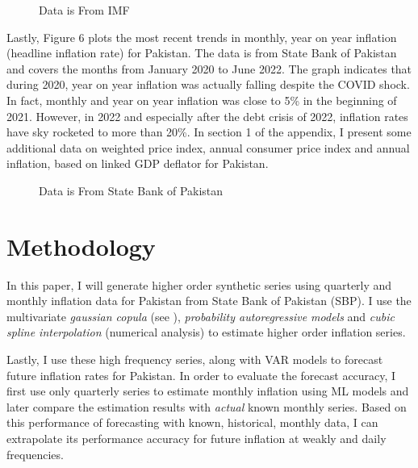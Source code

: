 \documentclass[12pt]{article}
\newcommand{\1}{\mathbbm 1}
\begin{document}
		
		\begin{figure}[H]
			\centering
			\scalebox{0.6}{}
			\hfill
			\caption{Data is From IMF}
		\end{figure}
		
		Lastly, Figure 6 plots the most recent trends in monthly, year on year inflation (headline inflation rate)  for Pakistan. The data is from State Bank of Pakistan and covers the months from January 2020 to June 2022. The graph indicates that during 2020, year on year inflation was actually falling despite the COVID shock. In fact, monthly and year on year inflation was close to 5\% in the beginning of 2021. However, in 2022 and especially after the debt crisis of 2022, inflation rates have sky rocketed to more than 20\%. In section 1 of the appendix, I present some additional data on weighted price index, annual consumer price index and annual inflation, based on linked GDP deflator for Pakistan.
		
		\begin{figure}[H]
			\centering
			\scalebox{0.8}{}
			\hfill
			\caption{Data is From State Bank of Pakistan}
		\end{figure}
		
		\section{Methodology}
		
		
		
		
		In this paper, I will generate higher order synthetic series using quarterly and monthly inflation data for Pakistan from State Bank of Pakistan (SBP). I use the multivariate \textit{gaussian copula} (see \cite{patki2016synthetic}), \textit{probability autoregressive models} and \textit{cubic spline interpolation} (numerical analysis) to estimate higher order inflation series.
		
		Lastly, I use these high frequency series, along with VAR models to forecast future inflation rates for Pakistan. In order to evaluate the forecast accuracy, I first use only quarterly series to estimate monthly inflation using ML models and later compare the estimation results with \textit{actual} known monthly series. Based on this performance of forecasting with known, historical, monthly data, I can extrapolate its performance accuracy for future inflation at weakly and daily frequencies.
		
		
		
		
\end{document}
